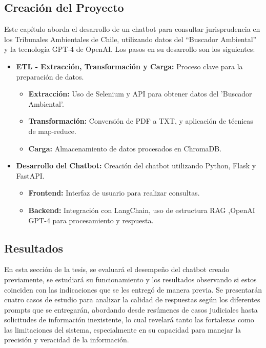 \subsection{Creación del Proyecto}

Este capítulo aborda el desarrollo de un chatbot para consultar jurisprudencia en los Tribunales Ambientales de Chile, 
utilizando datos del ``Buscador Ambiental'' y la tecnología GPT-4 de OpenAI. Los pasos en su desarrollo son los siguientes:

\begin{itemize}
    \item \textbf{ETL - Extracción, Transformación y Carga:} Proceso clave para la preparación de datos.
    \begin{itemize}
        \item \textbf{Extracción:} Uso de Selenium y API para obtener datos del 'Buscador Ambiental'.
        \item \textbf{Transformación:} Conversión de PDF a TXT, y aplicación de técnicas de map-reduce.
        \item \textbf{Carga:} Almacenamiento de datos procesados en ChromaDB.
    \end{itemize}

    \item \textbf{Desarrollo del Chatbot:} Creación del chatbot utilizando Python, Flask y FastAPI.
    \begin{itemize}
        \item \textbf{Frontend:} Interfaz de usuario para realizar consultas.
        \item \textbf{Backend:} Integración con LangChain, uso de estructura RAG ,OpenAI GPT-4 para procesamiento y respuesta.
    \end{itemize}
\end{itemize}

\newpage

\subsection{Resultados}

En esta sección de la tesis, se evaluará el desempeño del chatbot creado previamente, se estudiará su funcionamiento y los resultados 
observando si estos coinciden con las indicaciones que se les entregó de manera previa. Se presentarán cuatro 
casos de estudio para analizar la calidad de respuestas según los diferentes prompts que se entregarán, abordando desde resúmenes de casos judiciales 
hasta solicitudes de información inexistente, lo cual revelará tanto las fortalezas como las limitaciones del sistema, 
especialmente en su capacidad para manejar la precisión y veracidad de la información.

